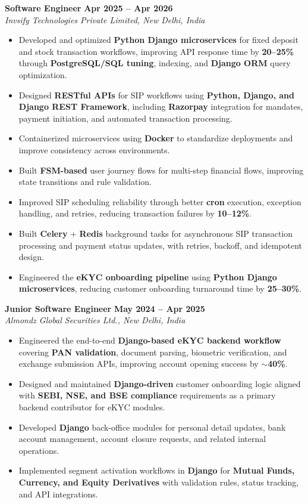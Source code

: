 \documentclass[10pt,letterpaper]{article}
\begin{document}
\textbf{Software Engineer} \hfill \textbf{Apr 2025 -- Apr 2026}\\
\textit{Invsify Technologies Private Limited, New Delhi, India}
\begin{itemize}
    \item Developed and optimized \textbf{Python Django microservices} for fixed deposit and stock transaction workflows, improving API response time by \textbf{20--25\%} through \textbf{PostgreSQL/SQL tuning}, indexing, and \textbf{Django ORM} query optimization.
    \item Designed \textbf{RESTful APIs} for SIP workflows using \textbf{Python, Django, and Django REST Framework}, including \textbf{Razorpay} integration for mandates, payment initiation, and automated transaction processing.
    \item Containerized microservices using \textbf{Docker} to standardize deployments and improve consistency across environments.
    \item Built \textbf{FSM-based} user journey flows for multi-step financial flows, improving state transitions and rule validation.
    \item Improved SIP scheduling reliability through better \textbf{cron} execution, exception handling, and retries, reducing transaction failures by \textbf{10--12\%}.
    \item Built \textbf{Celery} + \textbf{Redis} background tasks for asynchronous SIP transaction processing and payment status updates, with retries, backoff, and idempotent design.
    \item Engineered the \textbf{eKYC onboarding pipeline} using \textbf{Python Django microservices}, reducing customer onboarding turnaround time by \textbf{25--30\%}.
\end{itemize}

\textbf{Junior Software Engineer} \hfill \textbf{May 2024 -- Apr 2025}\\
\textit{Almondz Global Securities Ltd., New Delhi, India}
\begin{itemize}
    \item Engineered the end-to-end \textbf{Django-based eKYC backend workflow} covering \textbf{PAN validation}, document parsing, biometric verification, and exchange submission APIs, improving account opening success by \textbf{$\sim$40\%}.
    \item Designed and maintained \textbf{Django-driven} customer onboarding logic aligned with \textbf{SEBI, NSE, and BSE compliance} requirements as a primary backend contributor for eKYC modules.
    \item Developed \textbf{Django} back-office modules for personal detail updates, bank account management, account closure requests, and related internal operations.
    \item Implemented segment activation workflows in \textbf{Django} for \textbf{Mutual Funds, Currency, and Equity Derivatives} with validation rules, status tracking, and API integrations.
\end{itemize}
\end{document}
